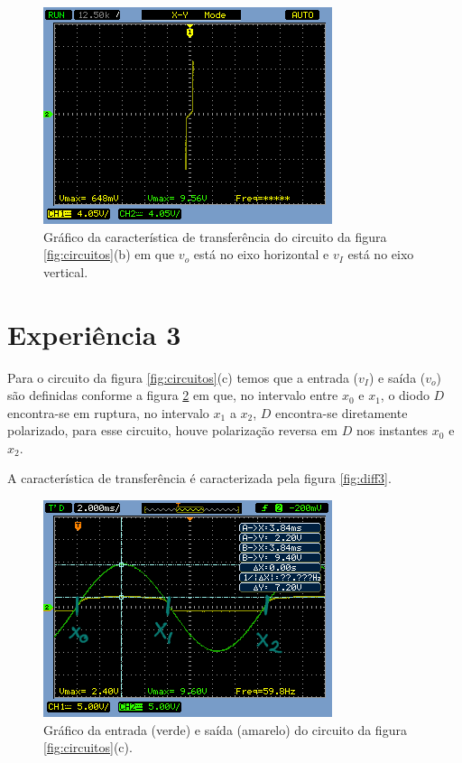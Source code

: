 \documentclass{abntex2}
\begin{document}
\begin{figure}[h]
  \centering
  \includegraphics[width=.8\textwidth]{diferenca-1b.png}
  \caption{Gráfico da característica de transferência do circuito da figura \ref{fig:circuitos}(b) em que $v_o$ está no eixo horizontal e $v_I$ está no eixo vertical.}
  \label{fig:diff2}
\end{figure}

\section{Experiência 3}

Para o circuito da figura \ref{fig:circuitos}(c) temos que a entrada ($v_I$) e saída ($v_o$) são definidas conforme a figura \ref{fig:io3}  em que, no intervalo entre $x_0$ e $x_1$, o diodo $D$ encontra-se em ruptura, no intervalo $x_1$ a $x_2$, $D$ encontra-se diretamente polarizado, para esse circuito, houve polarização reversa em $D$ nos instantes $x_0$ e $x_2$.

A característica de transferência é caracterizada pela figura \ref{fig:diff3}.

\begin{figure}[h]
  \centering
  \includegraphics[width=.8\textwidth]{circuito-1c-esboco2.png}
  \caption{Gráfico da entrada (verde) e saída (amarelo) do circuito da figura \ref{fig:circuitos}(c).}
  \label{fig:io3}
\end{figure}
\end{document}
